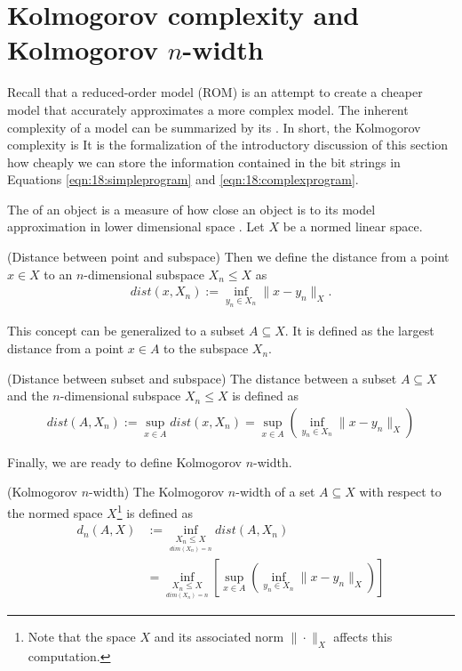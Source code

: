 \section{Kolmogorov complexity and Kolmogorov $n$-width}
Recall that a reduced-order model (ROM) is an attempt to create a cheaper model that accurately approximates a more complex model. The inherent complexity of a model can be summarized by its . In short, the Kolmogorov complexity is  It is the formalization of the introductory discussion of this section how cheaply we can store the information contained in the bit strings in Equations \eqref{eqn:18:simpleprogram} and \eqref{eqn:18:complexprogram}. 

The  of an object is a measure of how close an object is to its model approximation in lower dimensional space . Let $X$ be a normed linear space.
\begin{definition}{(Distance between point and subspace)}
Then we define the distance from a point $x \in X$ to an $n$-dimensional subspace $X_n \leq X$ as
\begin{align*}
    dist(x,X_n) := \inf_{y_n \in X_n} \|x - y_n\|_{X}.
\end{align*}
\end{definition}
This concept can be generalized to a subset $A \subseteq X$. It is defined as the largest distance from a point $x \in A$ to the subspace $X_n$. 
\begin{definition}{(Distance between subset and subspace)}
The distance between a subset $A \subseteq X$ and the $n$-dimensional subspace $X_n \leq X$ is defined as
\begin{align*}
    dist(A, X_n) := \sup_{x \in A} dist(x,X_n) = \sup_{x \in A} \left( \inf_{y_n \in X_n} \|x-y_n\|_{X} \right)
\end{align*}
\end{definition}
Finally, we are ready to define Kolmogorov $n$-width.
\begin{definition}{(Kolmogorov $n$-width)}
The Kolmogorov $n$-width of a set $A \subseteq X$ with respect to the normed space $X$\footnote{Note that the space $X$ and its associated norm $\|\cdot\|_{X}$ affects this computation.} is defined as
\begin{align*}
    d_{n}(A, X) &:= \inf_{\underset{dim(X_n)=n}{X_n \leq X}} dist(A,X_n) \\
        &= \inf_{\underset{dim(X_n)=n}{X_n \leq X}} \left[ \sup_{x \in A} \left( \inf_{y_n \in X_n} \|x - y_n\|_{X} \right)\right]
\end{align*}
\end{definition}
